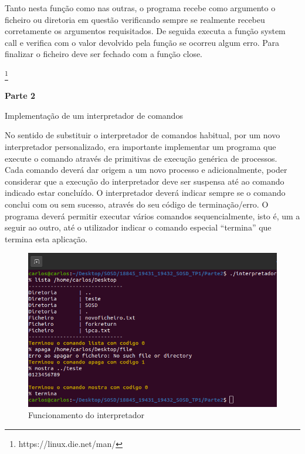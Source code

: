 \documentclass{article}
\begin{document}
	\vspace{2 em}
	Tanto nesta função como nas outras, o programa recebe como argumento o ficheiro ou diretoria em questão verificando sempre se realmente recebeu corretamente os argumentos requisitados. 
	De seguida executa a função system call e verifica com o valor devolvido pela função se ocorreu algum erro. Para finalizar o ficheiro deve ser fechado com a função close.
	
	\footnote[1]{https://linux.die.net/man/}
	
	\newpage
	
	
	\centerline{\textbf{Parte 2}}
	\vspace*{1 em}
	\centerline{Implementação de um interpretador de comandos}
	\vspace{3 em}
	
	No sentido de substituir o interpretador de comandos habitual, por um novo interpretador personalizado, era importante implementar um programa que execute o comando através de primitivas de execução genérica de processos. \\
	Cada comando deverá dar origem a um novo processo e adicionalmente, poder considerar que a execução do interpretador deve ser suspensa até ao comando indicado estar concluído. O interpretador deverá indicar sempre se o comando conclui com ou sem sucesso, através do seu código de terminação/erro. O programa deverá permitir executar vários comandos sequencialmente, isto é, um a seguir ao outro, até	o utilizador indicar o comando especial “termina” que termina esta aplicação.
	
	\vspace*{4 em}

	\begin{figure}[!htb]
		\centering
		\includegraphics[scale=0.7]{interpretador_parte2}
		\caption{Funcionamento do interpretador}
	\end{figure}
\end{document}
